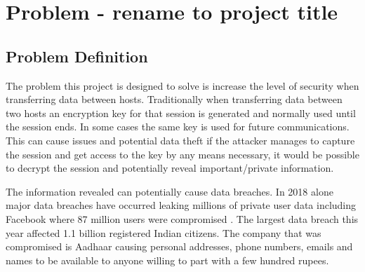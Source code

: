 \chapter{Problem - rename to project title}
\label{chap:problem}


\section{Problem Definition}

The problem this project is designed to solve is increase the level of security when transferring data between hosts. Traditionally when transferring data between two hosts an encryption key for that session is generated and normally used until the session ends. In some cases the same key is used for future communications. This can cause issues and potential data theft if the attacker manages to capture the session and get access to the key by any means necessary, it would be possible to decrypt the session and potentially reveal important/private information.

The information revealed can potentially cause data breaches. In 2018 alone major data breaches have occurred leaking millions of private user data including Facebook where 87 million users were compromised \cite{Data_breach_facebook}. The largest data breach this year affected 1.1 billion registered Indian citizens. The company that was compromised is Aadhaar \cite{Data_breach_Aadhaar} causing personal addresses, phone numbers, emails and names to be available to anyone willing to part with a few hundred rupees.

